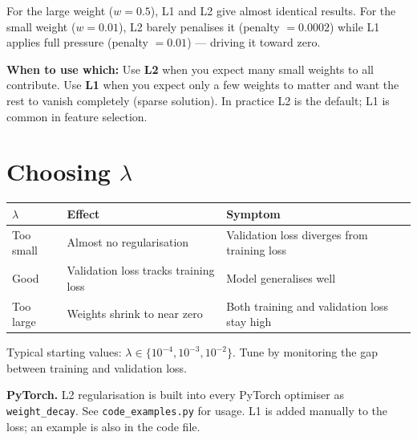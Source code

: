 \documentclass[12pt, a4paper]{article}
\theoremstyle{definition}
\begin{document}
For the large weight ($w=0.5$), L1 and L2 give almost identical results.
For the small weight ($w=0.01$), L2 barely penalises it (penalty $= 0.0002$)
while L1 applies full pressure (penalty $= 0.01$) --- driving it toward zero.

\begin{notebox}
\textbf{When to use which:}
Use \textbf{L2} when you expect many small weights to all contribute.
Use \textbf{L1} when you expect only a few weights to matter and want the
rest to vanish completely (sparse solution).
In practice L2 is the default; L1 is common in feature selection.
\end{notebox}

\section{Choosing $\lambda$}

\begin{center}
\renewcommand{\arraystretch}{1.3}
\begin{tabular}{lll}
\toprule
$\lambda$ & Effect & Symptom \\
\midrule
Too small & Almost no regularisation & Validation loss diverges from training loss \\
Good      & Validation loss tracks training loss & Model generalises well \\
Too large & Weights shrink to near zero & Both training and validation loss stay high \\
\bottomrule
\end{tabular}
\end{center}

Typical starting values: $\lambda \in \{10^{-4}, 10^{-3}, 10^{-2}\}$.
Tune by monitoring the gap between training and validation loss.

\begin{notebox}
\textbf{PyTorch.}
L2 regularisation is built into every PyTorch optimiser as
\texttt{weight\_decay}.  See \texttt{code\_examples.py} for usage.
L1 is added manually to the loss; an example is also in the code file.
\end{notebox}
\end{document}
